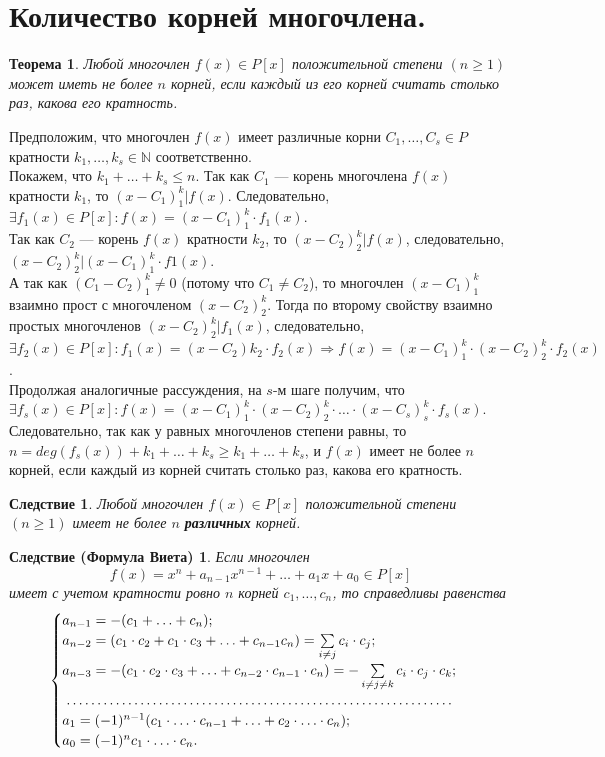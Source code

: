 \section{Количество корней многочлена.}
\newtheorem*{871}{Теорема}
\begin{871}
	Любой многочлен $f(x) \in P[x]$ положительной степени $(n\geqslant 1)$ может иметь не более $n$ корней, если каждый из 
	его корней считать столько раз, какова его кратность. 	
\end{871}
\begin{Proof}
	Предположим, что многочлен $f(x)$ имеет различные корни $C_1, \dots, C_s \in P$ кратности $k_1, \dots, k_s \in \mathbb{N}$ соответственно. \\
	Покажем, что $k_1 + \ldots + k_s \leqslant n$. 
	Так как $C_1$ --- корень многочлена $f(x)$ кратности $k_1$, то $(x - C_1)
	^k_1|f(x)$. Следовательно, $\exists f_1(x)\in P[x]: f(x) = (x - C_1)^k_1 \cdot f_1(x)$.\\ 
	Так как $C_2$ --- корень $f(x)$ кратности $k_2$, то $(x - C_2)^
	k_2|f(x)$, следовательно, $(x - C_2)^
	k_2|(x - C_1)
	^k_1\cdot f1(x)$.\\ А так как $(C_1 - C_2)^k_1 \not= 0$ 
	(потому что $C_1 \not= C_2$), то многочлен $(x - C_1)
	^k_1$ взаимно прост с многочленом $(x - C_2)^
	k_2$. Тогда по второму свойству взаимно простых 
	многочленов $(x - C_2)^
	k_2|f_1(x)$, следовательно, $\exists f_2(x) \in P[x]: f_1(x) = (x - C_2)
	k_2 \cdot f_2(x) \Rightarrow f(x) = (x - C_1)
	^k_1 \cdot (x - C_2)^k_2\cdot f_2(x)$.\\
	Продолжая аналогичные рассуждения, на $s$-м шаге получим, что $\exists f_s(x) \in P[x]: f(x) = (x - C_1)^k_1 \cdot 
	(x - C_2)^k_2 \cdot \ldots \cdot (x - C_s)^
	k_s\cdot f_s(x)$. Следовательно, так как у равных многочленов степени равны, то $n = deg(f_s(x)) + k_1 + \ldots 
	+ k_s \geqslant k_1 + \ldots + k_s$, и $f(x)$ имеет не более $n$ корней, если каждый из корней считать столько раз, какова
	его кратность.
\end{Proof}
\newtheorem*{872}{Следствие}
\begin{872}
	Любой многочлен $f(x) \in P[x]$ положительной степени $(n\geqslant 1)$ имеет не более $n$ \textbf{различных} корней.
\end{872}
\newtheorem*{873}{Следствие (Формула Виета)}
\begin{873}
	Если многочлен $$f(x) = x^n + a_{n-1}x^{n-1} + \ldots + a_1x + a_0\in P[x]$$ имеет с учетом кратности ровно $n$ корней $c_1, \ldots , c_n$, то справедливы равенства $$
	\begin{cases}
		a_{n-1}=-(c_1+ \ldots + c_n);\\
		a_{n-2}=(c_1 \cdot c_2 + c_1 \cdot c_3 + \ldots + c_{n-1} c_n)=\sum\limits_{i \not= j} c_i \cdot c_j;\\
		a_{n-3}= -(c_1\cdot c_2\cdot c_3 + \ldots + c_{n-2}\cdot c_{n-1}\cdot c_n) = -\sum\limits_{i \not= j \not= k} c_i \cdot c_j \cdot c_k;\\
		\dotfill\\
		a_1 = (-1)^{n-1}(c_1\cdot \ldots \cdot c_{n-1} + \ldots + c_2 \cdot \ldots \cdot c_n);\\
		a_0=(-1)^{n} c_1 \cdot \ldots \cdot c_n.
	\end{cases}$$
\end{873}
